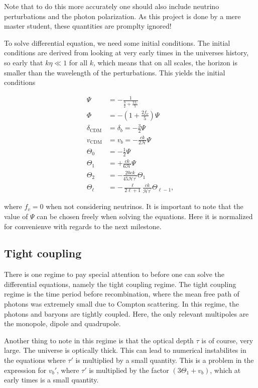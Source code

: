 \documentclass[12pt]{article}
\begin{document}
Note that to do this more accurately one should also include neutrino perturbations and the photon polarization. As this project is done by a mere master student, these quantities are promplty ignored!

To solve differential equation, we need some initial conditions. The initial conditions are derived from looking at very early times in the universes history, so early that $k\eta \ll 1$ for all $k$, which means that on all scales, the horizon is smaller than the wavelength of the perturbations. This yields the initial conditions

\begin{equation}\begin{aligned}\label{eq initial conditions}
    \Psi &=-\frac{1}{\frac{3}{2}+\frac{2 f_{v}}{5}} \\
    \Phi &=-\left(1+\frac{2 f_{\nu}}{5}\right) \Psi \\
    \delta_{\mathrm{CDM}} &=\delta_{b}=-\frac{3}{2} \Psi \\
    v_{\mathrm{CDM}} &=v_{b}=-\frac{c k}{2 \mathcal{H}} \Psi \\
    \Theta_{0} &=-\frac{1}{2} \Psi \\
    \Theta_{1} &=+\frac{c k}{6 \mathcal{H}} \Psi \\
    \Theta_{2} &= -\frac{20 c k}{45 \mathcal{H} \tau^{\prime}} \Theta_{1}\\
    \Theta_{\ell}&=-\frac{\ell}{2 \ell+1} \frac{c k}{\mathcal{H} \tau^{\prime}} \Theta_{\ell-1},
    \end{aligned}\end{equation}

where $f_v=0$ when not considering neutrinos. It is important to note that the value of $\Psi$ can be chosen freely when solving the equations. Here it is normalized for convenienve with regards to the next milestone.

\subsection{Tight coupling}
There is one regime to pay special attention to before one can solve the differential equations, namely the tight coupling regime. The tight coupling regime is the time period before recombination, where the mean free path of photons was extremely small due to Compton scattering. In this regime, the photons and baryons are tightly coupled. Here, the only relevant multipoles are the monopole, dipole and quadrupole.

Another thing to note in this regime is that the optical depth $\tau$ is of course, very large. The universe is optically thick. This can lead to numerical instabilites in the equations where $\tau'$ is multiplied by a small quantity. This is a problem in the expression for $v_b'$, where $\tau'$ is multiplied by the factor $(3\Theta_1 + v_b)$, which at early times is a small quantity. 
\end{document}
